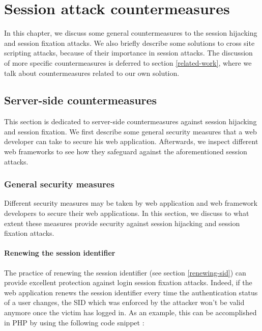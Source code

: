 \chapter{Session attack countermeasures}

In this chapter, we discuss some general countermeasures to the session hijacking and session fixation attacks. We also briefly describe some solutions to cross site scripting attacks, because of their importance in session attacks. The discussion of more specific countermeasures is deferred to section \ref{related-work}, where we talk about countermeasures related to our own solution. %

\section{Server-side countermeasures}

This section is dedicated to server-side countermeasures against session hijacking and session fixation. We first describe some general security measures that a web developer can take to secure his web application. Afterwards, we inspect different web frameworks to see how they safeguard against the aforementioned session attacks.

\subsection{General security measures}\label{general-security}

Different security measures may be taken by web application and web framework developers to secure their web applications. In this section, we discuss to what extent these measures provide security against session hijacking and session fixation attacks.

\subsubsection{Renewing the session identifier}\label{renewing}

The practice of renewing the session identifier (see section \ref{renewing-sid}) can provide excellent protection against \gls{login session fixation} attacks. Indeed, if the web application renews the session identifier every time the authentication status of a user changes, the SID which was enforced by the attacker won't be valid anymore once the victim has logged in. As an example, this can be accomplished in PHP by using the following code snippet \cite{PHPregenerate,Johns2011}:

